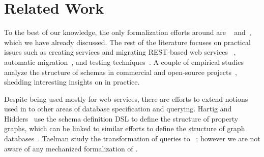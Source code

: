 \section{Related Work}\label{sec:related}

To the best of our knowledge, the only formalization efforts around \gql are \HP~\cite{gqlph} and~\cite{olafschema}, which we have already discussed. The rest of the \gql literature focuses on practical issues such as creating \gql services and migrating REST-based web services \gql~\cite{improvingoeeu, ehriapi, gqlexperiences}, automatic migration~\cite{migratingapi}, and testing techniques~\cite{gqldeviation}. A couple of empirical studies analyze the structure of \gql schemas in commercial and open-source projects~\cite{empiricalgql, empiricalapi}, shedding interesting insights on \gql in practice.

Despite being used mostly for web services, there are efforts to extend notions used in \gql to other areas of database specification and querying. Hartig and Hidders~\cite{olafschema} use the \gql schema definition DSL to define the structure of property graphs, which can be linked to similar efforts to define the structure of graph databases~\cite{schemaval}. Taelman \etal study the transformation of \gql queries to \sparql~\cite{gqlsparql}; however we are not aware of any mechanized formalization of \sparql.


